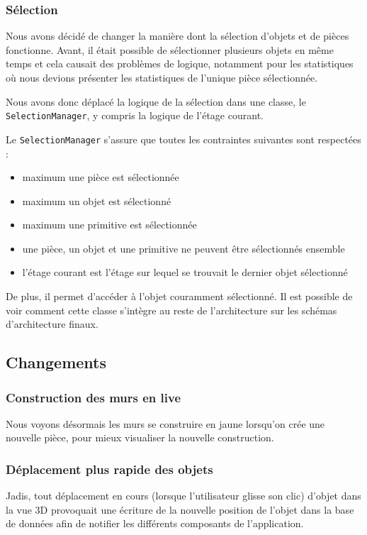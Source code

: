 	\subsubsection{Sélection}
	Nous avons décidé de changer la manière dont la sélection d'objets et de
	pièces fonctionne. Avant, il était possible de sélectionner plusieurs objets
	en même temps et cela causait des problèmes de logique, notamment pour les 
	statistiques où nous devions présenter les statistiques de l'unique pièce 
	sélectionnée.

	Nous avons donc déplacé la logique de la sélection dans une classe, le 
	\texttt{SelectionManager}, y compris la logique de l'étage courant.

	Le \texttt{SelectionManager} s'assure que toutes les contraintes suivantes
	sont respectées : 
	\begin{itemize}
		\item maximum une pièce est sélectionnée
		\item maximum un objet est sélectionné
		\item maximum une primitive est sélectionnée
		\item une pièce, un objet et une primitive ne peuvent être sélectionnés ensemble
		\item l'étage courant est l'étage sur lequel se trouvait le dernier objet sélectionné
	\end{itemize}

	De plus, il permet d'accéder à l'objet couramment sélectionné. Il est possible
	de voir comment cette classe s'intègre au reste de l'architecture sur les schémas
	d'architecture finaux.

\subsection{Changements}

	\subsubsection{Construction des murs en live}
	Nous voyons désormais les murs se construire en jaune lorsqu'on crée une
	nouvelle pièce, pour mieux visualiser la nouvelle construction.

	\subsubsection{Déplacement plus rapide des objets}
	Jadis, tout déplacement en cours (lorsque l'utilisateur glisse son clic) d'objet
	dans la vue 3D provoquait une écriture de la nouvelle position de l'objet dans
	la base de données afin de notifier les différents composants de l'application.

